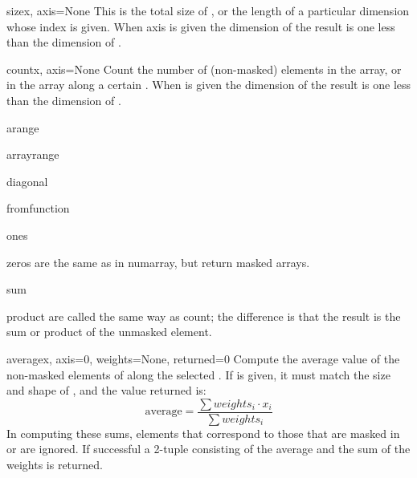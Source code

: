 \begin{funcdesc}{size}{x, axis=None}
   This is the total size of , or the length of a particular dimension
    whose index is given. When axis is given the dimension of the
   result is one less than the dimension of .
\end{funcdesc}

\begin{funcdesc}{count}{x, axis=None}
   Count the number of (non-masked) elements in the array, or in the array
   along a certain .  When  is given the dimension of the
   result is one less than the dimension of .
\end{funcdesc}

\begin{funcdesc}{arange}{}
\end{funcdesc}
\begin{funcdesc}{arrayrange}{}
\end{funcdesc}
\begin{funcdesc}{diagonal}{}
\end{funcdesc}
\begin{funcdesc}{fromfunction}{}
\end{funcdesc}
\begin{funcdesc}{ones}{}
\end{funcdesc}
\begin{funcdesc}{zeros}{}
   are the same as in numarray, but return masked arrays.
\end{funcdesc}

\begin{funcdesc}{sum}{}
\end{funcdesc}
\begin{funcdesc}{product}{}
   are called the same way as count; the difference is that the result is the
   sum or product of the unmasked element.
\end{funcdesc}

\begin{funcdesc}{average}{x, axis=0, weights=None, returned=0}
   Compute the average value of the non-masked elements of  along the
   selected . If  is given, it must match the size and
   shape of , and the value returned is:
   \begin{equation}
      \text{average} = \frac{\sum{}weights_i\cdot{}x_i}{\sum{}weights_i}
   \end{equation}
   In computing these sums, elements that correspond to those that are masked
   in  or  are ignored. If successful a 2-tuple consisting
   of the average and the sum of the weights is returned.
\end{funcdesc}

